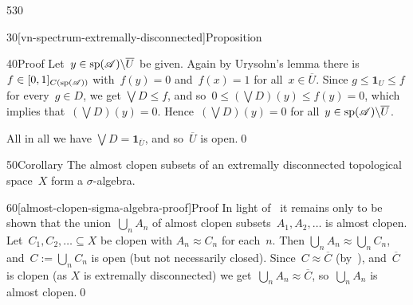\begin{parsec}{530}
\begin{point}{30}[vn-spectrum-extremally-disconnected]{Proposition}
\begin{point}{40}{Proof}
Let~$y\in \mathrm{sp}(\mathscr{A})\backslash \overline{U}$ be given.
Again by Urysohn's lemma
there is $f\in [0,1]_{C(\mathrm{sp}(\mathscr{A}))}$
with~$f(y)=0$ and~$f(x)=1$ for all~$x\in \overline{U}$.
Since $g\leq \mathbf{1}_U \leq f$
for every~$g\in D$,
we get $\bigvee D\leq f$,
and so~$0\leq (\bigvee D)(y)\leq f(y) =0$,
which implies that~$(\bigvee D)(y)=0$.
Hence~$(\bigvee D)(y)=0$ for all~$y\in \mathrm{sp}(\mathscr{A})\backslash \overline{U}$.

All in all we have $\bigvee D = \mathbf{1}_{\overline{U}}$,
and so~$\overline{U}$ is open.\qed
\end{point}
\end{point}
\begin{point}{50}{Corollary}%
The almost clopen subsets
of an extremally disconnected topological
space~$X$ form a $\sigma$-algebra.
\begin{point}{60}[almost-clopen-sigma-algebra-proof]{Proof}%
In light of~
it remains only to be shown that
the union~$\bigcup_n A_n$
of almost clopen subsets~$A_1,A_2,\dotsc$
is almost clopen.
Let~$C_1,C_2,\dotsc\subseteq X$
be clopen with $A_n\approx C_n$ for each~$n$.
Then $\bigcup_n A_n \approx \bigcup_n C_n$,
and~$C:=\bigcup_n C_n$ is open
(but not necessarily closed).
Since~$C\approx \overline{C}$
(by~),
and~$\overline{C}$ is clopen (as $X$ is extremally disconnected)
we get~$\bigcup_n A_n \approx \overline{C}$,
so~$\bigcup_n A_n$ is almost clopen.\qed
\end{point}
\end{point}
\end{parsec}
